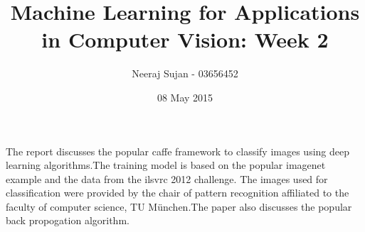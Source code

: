 \documentclass[12pt]{article}
\begin{document}
\title{Machine Learning for Applications in Computer Vision: Week 2}
\author{Neeraj Sujan - 03656452 }
\date{08 May 2015}

\maketitle




The report \cite{IEEEhowto:kopka} discusses the popular caffe framework to classify images using deep learning algorithms.The training model is based on the  popular imagenet example and the data from the ilsvrc 2012 challenge. The images used for classification were provided by the chair of pattern recognition affiliated to the faculty of computer science, TU M{\"u}nchen.The paper also discusses the popular back propogation algorithm.  
\end{document}
